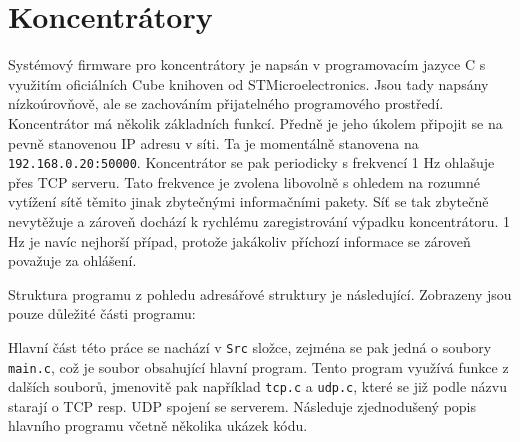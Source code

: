 \section{Koncentrátory}
Systémový firmware pro koncentrátory  je napsán v programovacím jazyce C s využitím oficiálních Cube knihoven od STMicroelectronics. Jsou tady napsány nízkoúrovňově, ale se zachováním přijatelného programového pro\-stře\-dí. Koncentrátor má několik základních funkcí. Předně je jeho úkolem připojit se na pevně stanovenou IP adresu v síti. Ta je momentálně stanovena na \texttt{192.168.0.20:50000}. Koncentrátor se pak periodicky s frekvencí 1 Hz o\-hla\-šu\-je přes TCP serveru. Tato frekvence je zvolena libovolně s ohledem na rozumné vytížení sítě těmito jinak zbytečnými informačními pakety. Síť se tak zbytečně nevytěžuje a zároveň dochází k rychlému zaregistrování výpadku koncentrátoru. 1 Hz je navíc nejhorší případ, protože jakákoliv příchozí informace se zároveň považuje za ohlášení.

Struktura programu z pohledu adresářové struktury je následující. Zobrazeny jsou pouze důležité části programu:

\begin{figure}[H]
\end{figure}

Hlavní část této práce se nachází v \texttt{Src} složce, zejména se pak jedná o soubory \texttt{main.c}, což je soubor obsahující hlavní program. Tento program využívá funkce z dalších souborů, jmenovitě pak například \texttt{tcp.c} a \texttt{udp.c}, které se již podle názvu starají o TCP resp. UDP spojení se serverem. Následuje zjednodušený popis hlavního programu včetně několika ukázek kódu.

